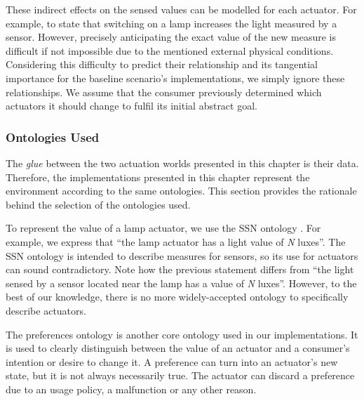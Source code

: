 These indirect effects on the sensed values can be modelled for each actuator.
For example, to state that switching on a lamp increases the light measured by a sensor.
However, precisely anticipating the exact value of the new measure is difficult if not impossible due to the mentioned external physical conditions.
Considering this difficulty to predict their relationship and its tangential importance for the baseline scenario's implementations, we simply ignore these relationships.
We assume that the consumer previously determined which actuators it should change to fulfil its initial abstract goal.


\subsubsection{Ontologies Used}

The \emph{glue} between the two actuation worlds presented in this chapter is their data.
Therefore, the implementations presented in this chapter represent the environment according to the same ontologies. %
This section provides the rationale behind the selection of the ontologies used.


To represent the value of a lamp actuator, we use the SSN ontology .
For example, we express that ``the lamp actuator has a light value of \emph{N} luxes''.
The SSN ontology is intended to describe measures for sensors, so its use for actuators can sound contradictory.
Note how the previous statement differs from ``the light sensed by a sensor located near the lamp has a value of \emph{N} luxes''.
However, to the best of our knowledge, there is no more widely-accepted ontology to specifically describe actuators.


The preferences ontology is another core ontology used in our implementations.
It is used to clearly distinguish between the value of an actuator and a consumer's intention or desire to change it.
A preference can turn into an actuator's new state, but it is not always necessarily true.
The actuator can discard a preference due to an usage policy, a malfunction or any other reason.

